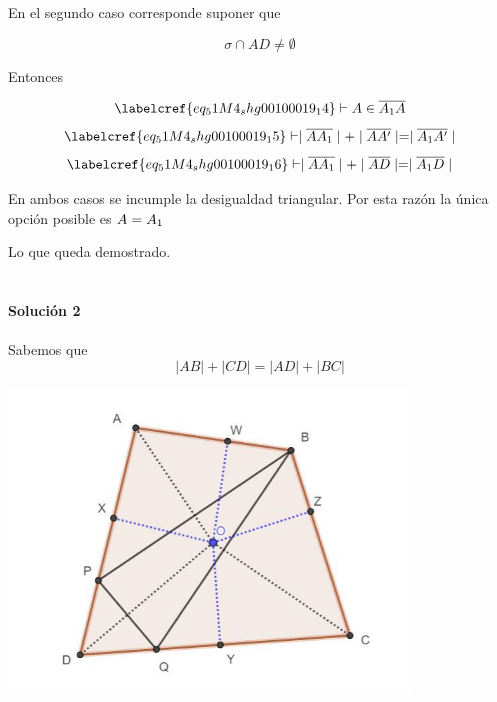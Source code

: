 En el segundo caso corresponde suponer que

\begin{equation} \label{eq_51M4_shg00100019_14}
	\sigma \cap AD \neq \emptyset
\end{equation}

Entonces 

\begin{equation} \label{eq_51M4_shg00100019_15}
	\labelcref{eq_51M4_shg00100019_14} \vdash A \in \overline{A\textsubscript{1}A}
\end{equation}
\begin{equation} \label{eq_51M4_shg00100019_16}
	\labelcref{eq_51M4_shg00100019_15} \vdash \mid\overline{AA\textsubscript{1}}\mid + \mid\overline{AA'}\mid = \mid\overline{A\textsubscript{1}A'}\mid
\end{equation}
\begin{equation} \label{eq_51M4_shg00100019_17}
	\labelcref{eq_51M4_shg00100019_16} \vdash \mid\overline{AA\textsubscript{1}}\mid + \mid\overline{AD}\mid = \mid\overline{A\textsubscript{1}D}\mid
\end{equation}

En ambos casos se incumple la desigualdad triangular. Por esta razón la única opción posible es $A = A\textsubscript{1}$

\vspace{1cm}
Lo que queda demostrado. \\\\\\

\noindent\textbf{Solución 2}\\\\

Sabemos que 
\begin{equation}
\label{eq1}
|AB| + |CD| = |AD| + |BC|
\end{equation}

\begin{center}
	\includegraphics[width=0.8\textwidth]{img/51M04_shg00100019.1.png}
\end{center}

